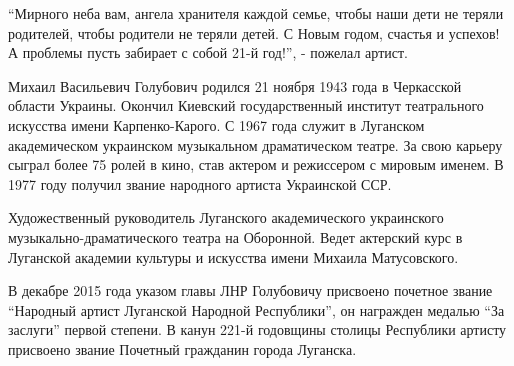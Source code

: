 
\enquote{Мирного неба вам, ангела хранителя каждой семье, чтобы наши дети не теряли
родителей, чтобы родители не теряли детей. С Новым годом, счастья и успехов! А
проблемы пусть забирает с собой 21-й год!}, - пожелал артист.

Михаил Васильевич Голубович родился 21 ноября 1943 года в Черкасской области
Украины. Окончил Киевский государственный институт театрального искусства имени
Карпенко-Карого. С 1967 года служит в Луганском академическом украинском
музыкальном драматическом театре. За свою карьеру сыграл более 75 ролей в кино,
став актером и режиссером с мировым именем. В 1977 году получил звание
народного артиста Украинской ССР.

Художественный руководитель Луганского академического украинского
музыкально-драматического театра на Оборонной. Ведет актерский курс в Луганской
академии культуры и искусства имени Михаила Матусовского.

В декабре 2015 года указом главы ЛНР Голубовичу присвоено почетное звание
\enquote{Народный артист Луганской Народной Республики}, он награжден  медалью \enquote{За
заслуги} первой степени. В канун 221-й годовщины столицы Республики артисту
присвоено звание Почетный гражданин города Луганска.

